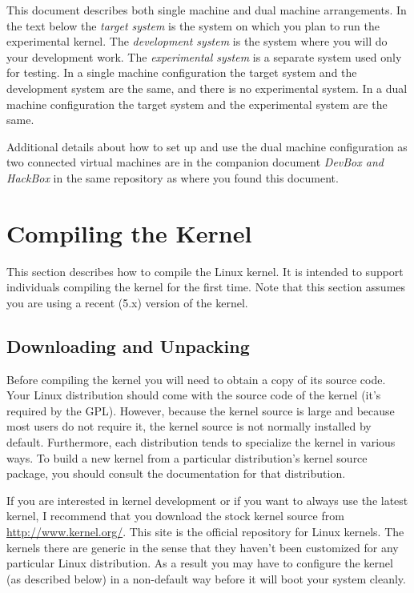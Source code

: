 \documentclass{article}
\newcommand{\newterm}[1]{\textit{#1}}
\begin{document}
This document describes both single machine and dual machine arrangements. In the text below the
\newterm{target system} is the system on which you plan to run the experimental kernel. The
\newterm{development system} is the system where you will do your development work. The
\newterm{experimental system} is a separate system used only for testing. In a single machine
configuration the target system and the development system are the same, and there is no
experimental system. In a dual machine configuration the target system and the experimental
system are the same.

Additional details about how to set up and use the dual machine configuration as two connected
virtual machines are in the companion document \textit{DevBox and HackBox} in the same
repository as where you found this document.

\section{Compiling the Kernel}

This section describes how to compile the Linux kernel. It is intended to support individuals
compiling the kernel for the first time. Note that this section assumes you are using a recent
(5.x) version of the kernel.

\subsection{Downloading and Unpacking}

Before compiling the kernel you will need to obtain a copy of its source code. Your Linux
distribution should come with the source code of the kernel (it's required by the GPL). However,
because the kernel source is large and because most users do not require it, the kernel source
is not normally installed by default. Furthermore, each distribution tends to specialize the
kernel in various ways. To build a new kernel from a particular distribution's kernel source
package, you should consult the documentation for that distribution.

If you are interested in kernel development or if you want to always use the latest kernel, I
recommend that you download the stock kernel source from \url{http://www.kernel.org/}. This site
is the official repository for Linux kernels. The kernels there are generic in the sense that
they haven't been customized for any particular Linux distribution. As a result you may have to
configure the kernel (as described below) in a non-default way before it will boot your system
cleanly.
\end{document}
